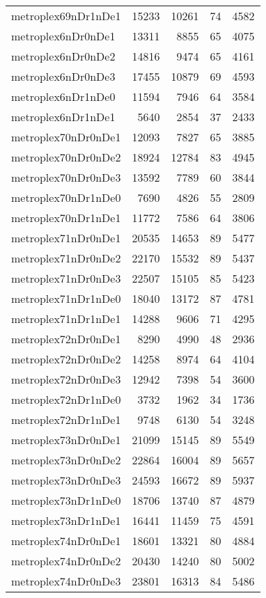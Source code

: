 \begin{longtable}{lrrrr}
metroplex69nDr1nDe1 & 15233 & 10261 & 74 & 4582 \\
metroplex6nDr0nDe1 & 13311 & 8855 & 65 & 4075 \\
metroplex6nDr0nDe2 & 14816 & 9474 & 65 & 4161 \\
metroplex6nDr0nDe3 & 17455 & 10879 & 69 & 4593 \\
metroplex6nDr1nDe0 & 11594 & 7946 & 64 & 3584 \\
metroplex6nDr1nDe1 & 5640 & 2854 & 37 & 2433 \\
metroplex70nDr0nDe1 & 12093 & 7827 & 65 & 3885 \\
metroplex70nDr0nDe2 & 18924 & 12784 & 83 & 4945 \\
metroplex70nDr0nDe3 & 13592 & 7789 & 60 & 3844 \\
metroplex70nDr1nDe0 & 7690 & 4826 & 55 & 2809 \\
metroplex70nDr1nDe1 & 11772 & 7586 & 64 & 3806 \\
metroplex71nDr0nDe1 & 20535 & 14653 & 89 & 5477 \\
metroplex71nDr0nDe2 & 22170 & 15532 & 89 & 5437 \\
metroplex71nDr0nDe3 & 22507 & 15105 & 85 & 5423 \\
metroplex71nDr1nDe0 & 18040 & 13172 & 87 & 4781 \\
metroplex71nDr1nDe1 & 14288 & 9606 & 71 & 4295 \\
metroplex72nDr0nDe1 & 8290 & 4990 & 48 & 2936 \\
metroplex72nDr0nDe2 & 14258 & 8974 & 64 & 4104 \\
metroplex72nDr0nDe3 & 12942 & 7398 & 54 & 3600 \\
metroplex72nDr1nDe0 & 3732 & 1962 & 34 & 1736 \\
metroplex72nDr1nDe1 & 9748 & 6130 & 54 & 3248 \\
metroplex73nDr0nDe1 & 21099 & 15145 & 89 & 5549 \\
metroplex73nDr0nDe2 & 22864 & 16004 & 89 & 5657 \\
metroplex73nDr0nDe3 & 24593 & 16672 & 89 & 5937 \\
metroplex73nDr1nDe0 & 18706 & 13740 & 87 & 4879 \\
metroplex73nDr1nDe1 & 16441 & 11459 & 75 & 4591 \\
metroplex74nDr0nDe1 & 18601 & 13321 & 80 & 4884 \\
metroplex74nDr0nDe2 & 20430 & 14240 & 80 & 5002 \\
metroplex74nDr0nDe3 & 23801 & 16313 & 84 & 5486 \\

\end{longtable}

